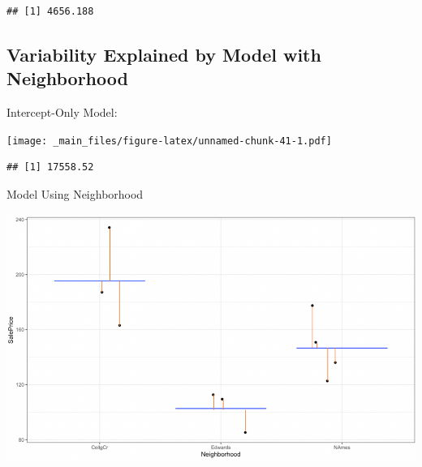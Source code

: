 \documentclass[]{book}
\newenvironment{Shaded}{\begin{snugshade}}{\end{snugshade}}
\newcommand{\KeywordTok}[1]{\textcolor[rgb]{0.13,0.29,0.53}{\textbf{#1}}}
\newcommand{\DecValTok}[1]{\textcolor[rgb]{0.00,0.00,0.81}{#1}}
\newcommand{\OperatorTok}[1]{\textcolor[rgb]{0.81,0.36,0.00}{\textbf{#1}}}
\newcommand{\NormalTok}[1]{#1}
\begin{document}
\begin{Shaded}
\end{Shaded}

\begin{verbatim}
## [1] 4656.188
\end{verbatim}

\subsection{Variability Explained by Model with
Neighborhood}\label{variability-explained-by-model-with-neighborhood}

Intercept-Only Model:

\texttt{[image: \_main\_files/figure-latex/unnamed-chunk-41-1.pdf]}

\begin{Shaded}
\end{Shaded}

\begin{verbatim}
## [1] 17558.52
\end{verbatim}

Model Using Neighborhood

\includegraphics[width=13.53in]{Cat_Resid}

\begin{Shaded}
\end{Shaded}
\end{document}

